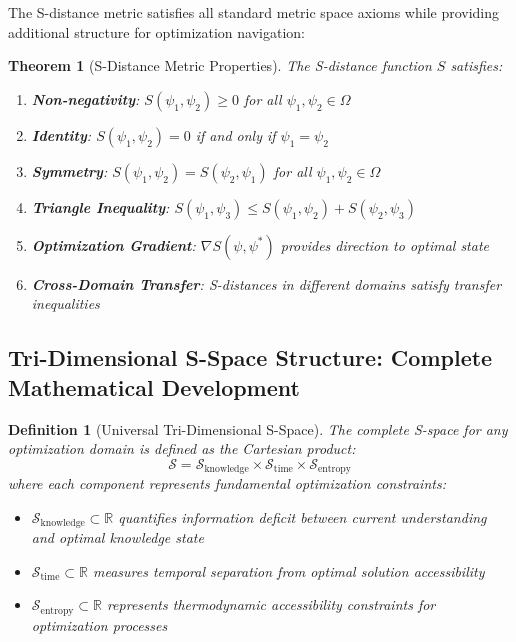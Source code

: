 \documentclass[12pt,a4paper]{article}
\newtheorem{theorem}{Theorem}
\newtheorem{definition}{Definition}
\begin{document}
The S-distance metric satisfies all standard metric space axioms while providing additional structure for optimization navigation:

\begin{theorem}[S-Distance Metric Properties]
The S-distance function $S$ satisfies:
\begin{enumerate}
\item \textbf{Non-negativity}: $S(\psi_1, \psi_2) \geq 0$ for all $\psi_1, \psi_2 \in \Omega$
\item \textbf{Identity}: $S(\psi_1, \psi_2) = 0$ if and only if $\psi_1 = \psi_2$
\item \textbf{Symmetry}: $S(\psi_1, \psi_2) = S(\psi_2, \psi_1)$ for all $\psi_1, \psi_2 \in \Omega$
\item \textbf{Triangle Inequality}: $S(\psi_1, \psi_3) \leq S(\psi_1, \psi_2) + S(\psi_2, \psi_3)$
\item \textbf{Optimization Gradient}: $\nabla S(\psi, \psi^*)$ provides direction to optimal state
\item \textbf{Cross-Domain Transfer}: S-distances in different domains satisfy transfer inequalities
\end{enumerate}
\end{theorem}

\subsection{Tri-Dimensional S-Space Structure: Complete Mathematical Development}

\begin{definition}[Universal Tri-Dimensional S-Space]
The complete S-space for any optimization domain is defined as the Cartesian product:
\begin{equation}
\mathcal{S} = \mathcal{S}_{\text{knowledge}} \times \mathcal{S}_{\text{time}} \times \mathcal{S}_{\text{entropy}}
\end{equation}
where each component represents fundamental optimization constraints:
\begin{itemize}
\item $\mathcal{S}_{\text{knowledge}} \subset \mathbb{R}$ quantifies information deficit between current understanding and optimal knowledge state
\item $\mathcal{S}_{\text{time}} \subset \mathbb{R}$ measures temporal separation from optimal solution accessibility  
\item $\mathcal{S}_{\text{entropy}} \subset \mathbb{R}$ represents thermodynamic accessibility constraints for optimization processes
\end{itemize}
\end{definition}
\end{document}
